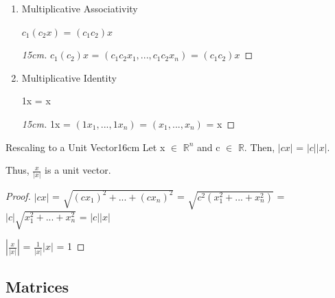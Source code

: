 \begin{enumerate}[label=(\alph*), leftmargin=2cm, itemsep=0.1cm]
        \item {\color{lgreen} Multiplicative Associativity}
        
            \hspace{0.5cm}
            $c_1(c_2x)$ = $(c_1c_2)x$

            \begin{proof}[15cm]
                $c_1(c_2)x$
                = $(c_1c_2x_1,...,c_1c_2x_n)$
                = $(c_1c_2)x$
            \end{proof}

        \item {\color{lgreen} Multiplicative Identity}
        
            \hspace{0.5cm}
            1x = x

            \begin{proof}[15cm]
                1x
                = $(1x_1,...,1x_n)$
                = $(x_1,...,x_n)$
                = x
            \end{proof}
    \end{enumerate}

    \vspace{0.5cm}



    \begin{wtheorem}{Rescaling to a Unit Vector}{16cm}
        Let x $\in$ $\mathbb{R}^n$ and c $\in$ $\mathbb{R}$.
        Then, $|cx|$ = $|c| |x|$.

        Thus, $\frac{x}{|x|}$ is a unit vector.
    \end{wtheorem}

    \begin{proof}
        $|cx|$ = $\sqrt{(cx_1)^2 + ... + (cx_n)^2}$
        = $\sqrt{c^2(x_1^2 + ... + x_n^2)}$
        = $|c| \sqrt{x_1^2 + ... + x_n^2}$
        = $|c| |x|$

        $|\frac{x}{|x|}|$
        = $\frac{1}{|x|} |x|$
        = 1
    \end{proof}

    \vspace{0.5cm}

    



\subsection{ Matrices }

